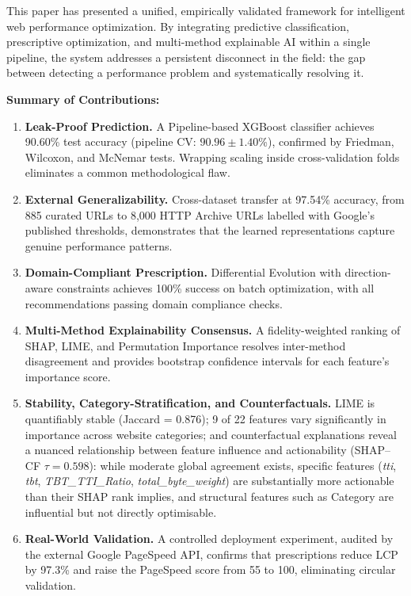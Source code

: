 \documentclass[sn-nature]{sn-jnl}
\begin{document}
This paper has presented a unified, empirically validated framework for intelligent web performance optimization. By integrating predictive classification, prescriptive optimization, and multi-method explainable AI within a single pipeline, the system addresses a persistent disconnect in the field: the gap between detecting a performance problem and systematically resolving it.

\textbf{Summary of Contributions:}

\begin{enumerate}
    \item \textbf{Leak-Proof Prediction.} A Pipeline-based XGBoost classifier achieves 90.60\% test accuracy (pipeline CV: $90.96 \pm 1.40$\%), confirmed by Friedman, Wilcoxon, and McNemar tests. Wrapping scaling inside cross-validation folds eliminates a common methodological flaw.

    \item \textbf{External Generalizability.} Cross-dataset transfer at 97.54\% accuracy, from 885 curated URLs to 8,000 HTTP Archive URLs labelled with Google's published thresholds, demonstrates that the learned representations capture genuine performance patterns.

    \item \textbf{Domain-Compliant Prescription.} Differential Evolution with direction-aware constraints achieves 100\% success on batch optimization, with all recommendations passing domain compliance checks.

    \item \textbf{Multi-Method Explainability Consensus.} A fidelity-weighted ranking of SHAP, LIME, and Permutation Importance resolves inter-method disagreement and provides bootstrap confidence intervals for each feature's importance score.

    \item \textbf{Stability, Category-Stratification, and Counterfactuals.} LIME is quantifiably stable (Jaccard = 0.876); 9 of 22 features vary significantly in importance across website categories; and counterfactual explanations reveal a nuanced relationship between feature influence and actionability (SHAP--CF $\tau = 0.598$): while moderate global agreement exists, specific features (\textit{tti}, \textit{tbt}, \textit{TBT\_TTI\_Ratio}, \textit{total\_byte\_weight}) are substantially more actionable than their SHAP rank implies, and structural features such as Category are influential but not directly optimisable.

    \item \textbf{Real-World Validation.} A controlled deployment experiment, audited by the external Google PageSpeed API, confirms that prescriptions reduce LCP by 97.3\% and raise the PageSpeed score from 55 to 100, eliminating circular validation.
\end{enumerate}
\end{document}
